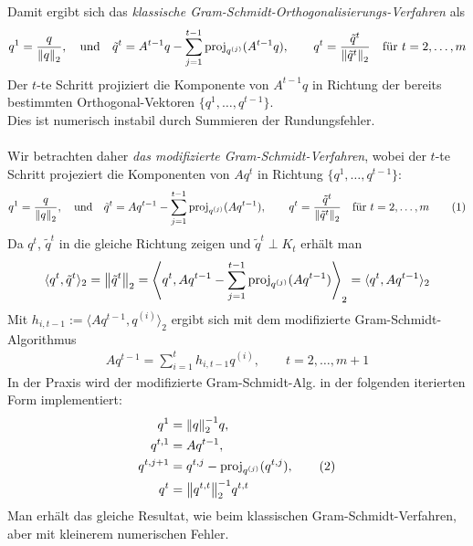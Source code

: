 Damit ergibt sich das \textit{klassische Gram-Schmidt-Orthogonalisierungs-Verfahren} als 
%
\begin{align*}
  q^{1} 
  = \dfrac{q}{\vertn{2}{q}_2},
  \quad\text{und}\quad
  \tilde{q}^{t} 
  = A^{t-1}q - \sum_{j=1}^{t-1} \text{proj}_{q^{(j)}}(A^{t-1}q), 
\qquad q^t = \dfrac{\tilde{q}^t}{\vertn{2}{\tilde{q}^t}_2}\quad\text{für } t=2,\dots,m\end{align*}
Der $t$-te Schritt projiziert die Komponente von $A^{t-1}q$ in Richtung der bereits bestimmten Orthogonal-Vektoren 
$\{q^1,\dots,q^{t-1}\}$. \\
Dies ist numerisch instabil durch Summieren der Rundungsfehler. \\ \\
Wir betrachten daher \textit{das modifizierte Gram-Schmidt-Verfahren}, wobei der $t$-te Schritt projeziert die Komponenten
von $Aq^t$ in Richtung $\{q^1,\dots,q^{t-1}\}$:
\begin{align*}q^{1} = \dfrac{q}{\vertn{2}{q}_2},\quad\text{und}\quad\tilde{q}^{t} = Aq^{t-1} - \sum_{j=1}^{t-1} \text{proj}_{q^{(j)}}(Aq^{t-1}), 
\qquad q^t = \dfrac{\tilde{q}^t}{\vertn{2}{\tilde{q}^t}_2}\quad\text{für } t=2,\dots,m \tag{1}\end{align*}
Da $q^t$, $\tilde{q}^t$ in die gleiche Richtung zeigen und $\tilde{q}^t\perp K_t$ erhält man 
\begin{align*}\langle q^t, \tilde{q}^t\rangle_2 = \vertn{2}{\tilde{q}^t}_2 = 
\left\langle q^t,Aq^{t-1} - \sum_{j=1}^{t-1} \text{proj}_{q^{(j)}}(Aq^{t-1})\right\rangle_2 = \langle q^t, Aq^{t-1}\rangle_2\end{align*}
Mit $h_{i,t-1} := \langle Aq^{t-1},q^{(i)} \rangle_2$ ergibt sich mit dem modifizierte Gram-Schmidt-Algorithmus
\begin{align*}Aq^{t-1}=\sum_{i=1}^{t} h_{i,t-1 }q^{(i)}, \qquad t=2,\dots,m+1\end{align*}
In der Praxis wird der modifizierte Gram-Schmidt-Alg. in der folgenden iterierten Form implementiert:
\begin{align*}
  q^1 &= \vertn{2}{q}_2^{-1}q, \\
  q^{t,1}&=Aq^{t-1}, \\
  q^{t,j+1}&=q^{t,j}-\text{proj}_{q^{(j)}}(q^{t,j}), \tag{2}\\
  q^t&=\vertn{2}{q^{t,t}}_2^{-1}q^{t,t}
\end{align*}
Man erhält das gleiche Resultat, wie beim klassischen Gram-Schmidt-Verfahren, aber mit kleinerem numerischen Fehler. \\ \\
